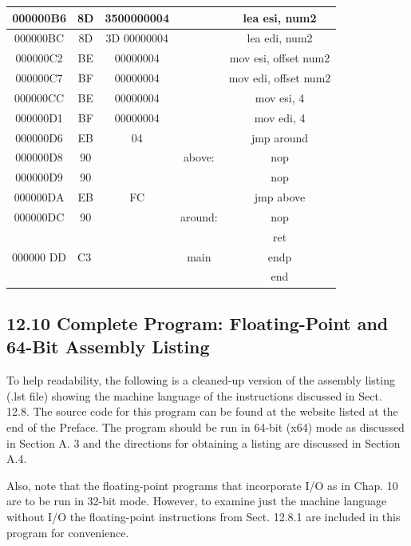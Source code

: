\documentclass[10pt]{book}
\begin{document}
\begin{center}
\begin{tabular}{|c|c|c|c|c|}
\hline
000000B6 & 8D & 3500000004 &  & lea esi, num2 \\
\hline
000000BC & 8D & 3D 00000004 &  & lea edi, num2 \\
\hline
000000C2 & BE & 00000004 &  & mov esi, offset num2 \\
\hline
000000C7 & BF & 00000004 &  & mov edi, offset num2 \\
\hline
000000CC & BE & 00000004 &  & mov esi, 4 \\
\hline
000000D1 & BF & 00000004 &  & mov edi, 4 \\
\hline
000000D6 & EB & 04 &  & jmp around \\
\hline
000000D8 & 90 &  & above: & nop \\
\hline
000000D9 & 90 &  &  & nop \\
\hline
000000DA & EB & FC &  & jmp above \\
\hline
000000DC & 90 &  & around: & nop \\
\hline
\multirow[t]{3}{*}{000000 DD} & \multicolumn{2}{|l|}{\multirow[t]{3}{*}{C3}} &  & ret \\
\hline
 &  &  & main & endp \\
\hline
 &  &  &  & end \\
\hline
\end{tabular}
\end{center}

\subsection*{12.10 Complete Program: Floating-Point and 64-Bit Assembly Listing}
To help readability, the following is a cleaned-up version of the assembly listing (.lst file) showing the machine language of the instructions discussed in Sect. 12.8. The source code for this program can be found at the website listed at the end of the Preface. The program should be run in 64-bit (x64) mode as discussed in Section A. 3 and the directions for obtaining a listing are discussed in Section A.4.


Also, note that the floating-point programs that incorporate I/O as in Chap. 10 are to be run in 32-bit mode. However, to examine just the machine language without I/O the floating-point instructions from Sect. 12.8.1 are included in this program for convenience.
\end{document}

